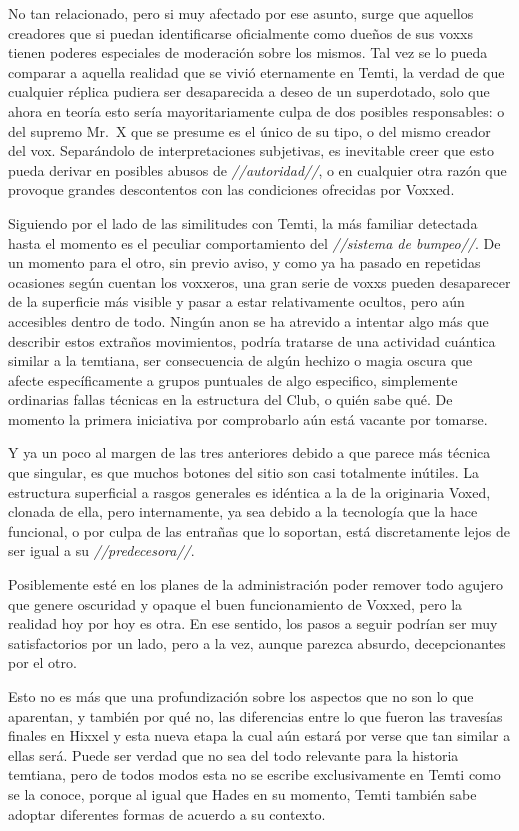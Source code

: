 \documentclass[
  spanish,
]{book}
\begin{document}
No tan relacionado, pero si muy afectado por ese asunto, surge que aquellos creadores que si puedan identificarse oficialmente como dueños de sus voxxs tienen poderes especiales de moderación sobre los mismos. Tal vez se lo pueda comparar a aquella realidad que se vivió eternamente en Temti, la verdad de que cualquier réplica pudiera ser desaparecida a deseo de un superdotado, solo que ahora en teoría esto sería mayoritariamente culpa de dos posibles responsables: o del supremo Mr.~X que se presume es el único de su tipo, o del mismo creador del vox. Separándolo de interpretaciones subjetivas, es inevitable creer que esto pueda derivar en posibles abusos de \emph{//autoridad//}, o en cualquier otra razón que provoque grandes descontentos con las condiciones ofrecidas por Voxxed.

Siguiendo por el lado de las similitudes con Temti, la más familiar detectada hasta el momento es el peculiar comportamiento del \emph{//sistema de bumpeo//}. De un momento para el otro, sin previo aviso, y como ya ha pasado en repetidas ocasiones según cuentan los voxxeros, una gran serie de voxxs pueden desaparecer de la superficie más visible y pasar a estar relativamente ocultos, pero aún accesibles dentro de todo. Ningún anon se ha atrevido a intentar algo más que describir estos extraños movimientos, podría tratarse de una actividad cuántica similar a la temtiana, ser consecuencia de algún hechizo o magia oscura que afecte específicamente a grupos puntuales de algo especifico, simplemente ordinarias fallas técnicas en la estructura del Club, o quién sabe qué. De momento la primera iniciativa por comprobarlo aún está vacante por tomarse.

Y ya un poco al margen de las tres anteriores debido a que parece más técnica que singular, es que muchos botones del sitio son casi totalmente inútiles. La estructura superficial a rasgos generales es idéntica a la de la originaria Voxed, clonada de ella, pero internamente, ya sea debido a la tecnología que la hace funcional, o por culpa de las entrañas que lo soportan, está discretamente lejos de ser igual a su \emph{//predecesora//}.

Posiblemente esté en los planes de la administración poder remover todo agujero que genere oscuridad y opaque el buen funcionamiento de Voxxed, pero la realidad hoy por hoy es otra. En ese sentido, los pasos a seguir podrían ser muy satisfactorios por un lado, pero a la vez, aunque parezca absurdo, decepcionantes por el otro.

Esto no es más que una profundización sobre los aspectos que no son lo que aparentan, y también por qué no, las diferencias entre lo que fueron las travesías finales en Hixxel y esta nueva etapa la cual aún estará por verse que tan similar a ellas será. Puede ser verdad que no sea del todo relevante para la historia temtiana, pero de todos modos esta no se escribe exclusivamente en Temti como se la conoce, porque al igual que Hades en su momento, Temti también sabe adoptar diferentes formas de acuerdo a su contexto.
\end{document}

